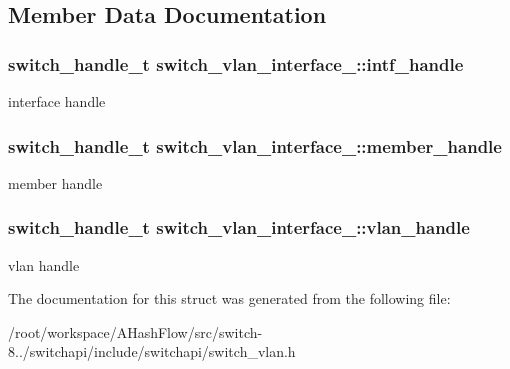 \subsection{Member Data Documentation}
\hypertarget{structswitch__vlan__interface___a985fdd20dbc07d53a431cfd42fbed34a}{
\subsubsection[{intf\+\_\+handle}]{\setlength{\rightskip}{0pt plus 5cm}switch\+\_\+handle\+\_\+t switch\+\_\+vlan\+\_\+interface\+\_\+\+::intf\+\_\+handle}}\label{structswitch__vlan__interface___a985fdd20dbc07d53a431cfd42fbed34a}
interface handle \hypertarget{structswitch__vlan__interface___a5c82f91ef7056f4e3d4562dd9aa67166}{
\subsubsection[{member\+\_\+handle}]{\setlength{\rightskip}{0pt plus 5cm}switch\+\_\+handle\+\_\+t switch\+\_\+vlan\+\_\+interface\+\_\+\+::member\+\_\+handle}}\label{structswitch__vlan__interface___a5c82f91ef7056f4e3d4562dd9aa67166}
member handle \hypertarget{structswitch__vlan__interface___a84a06c03b1622c743e736a494b78a4cb}{
\subsubsection[{vlan\+\_\+handle}]{\setlength{\rightskip}{0pt plus 5cm}switch\+\_\+handle\+\_\+t switch\+\_\+vlan\+\_\+interface\+\_\+\+::vlan\+\_\+handle}}\label{structswitch__vlan__interface___a84a06c03b1622c743e736a494b78a4cb}
vlan handle 

The documentation for this struct was generated from the following file\+:\begin{DoxyCompactItemize}
\item 
/root/workspace/\+A\+Hash\+Flow/src/switch-\/8../switchapi/include/switchapi/switch\+\_\+vlan.\+h\end{DoxyCompactItemize}
